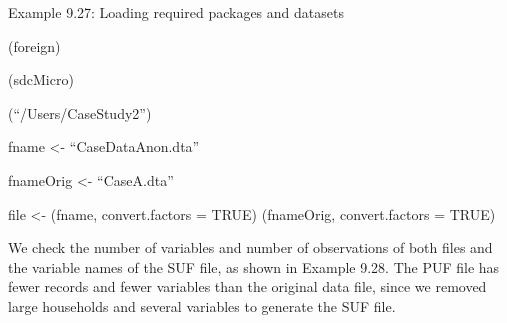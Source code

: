 \documentclass[letterpaper,10pt,english]{sphinxmanual}
\begin{document}
Example 9.27: Loading required packages and datasets

\begin{DUlineblock}{0em}
\item[] 
\item[] (foreign) 
\item[] (sdcMicro) 
\end{DUlineblock}

\begin{DUlineblock}{0em}
\item[] 
\item[] (“/Users/CaseStudy2”)
\end{DUlineblock}

\begin{DUlineblock}{0em}
\item[] 
\item[] fname \textless{}- “CaseDataAnon.dta”
\end{DUlineblock}

\begin{DUlineblock}{0em}
\item[] 
\item[] fnameOrig \textless{}- “CaseA.dta”
\end{DUlineblock}

\begin{DUlineblock}{0em}
\item[] 
\item[] file \textless{}- (fname, convert.factors = TRUE) (fnameOrig, convert.factors = TRUE) 
\end{DUlineblock}

We check the number of variables and number of observations of both
files and the variable names of the SUF file, as shown in Example 9.28.
The PUF file has fewer records and fewer variables than the original
data file, since we removed large households and several variables to
generate the SUF file.
\end{document}
